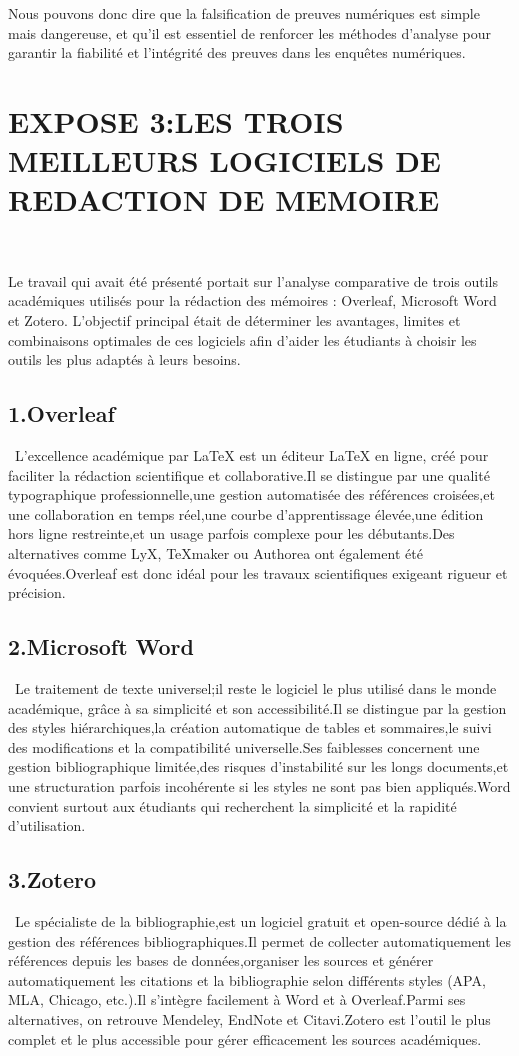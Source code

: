 \documentclass[12pt,a4paper]{report}
\begin{document}
{Nous pouvons donc dire que la falsification de preuves numériques est simple mais dangereuse, et qu’il est essentiel de renforcer les méthodes d’analyse pour garantir la fiabilité et l’intégrité des preuves dans les enquêtes numériques.
	\section*{EXPOSE 3:LES TROIS MEILLEURS LOGICIELS DE REDACTION DE MEMOIRE }\
	
	Le travail qui avait été présenté portait sur l’analyse comparative de trois outils académiques utilisés pour la rédaction des mémoires : Overleaf, Microsoft Word et Zotero. L’objectif principal était de déterminer les avantages, limites et combinaisons optimales de ces logiciels afin d’aider les étudiants à choisir les outils les plus adaptés à leurs besoins.
	
	\subsection*{1.Overleaf}\ L’excellence académique par LaTeX est un éditeur LaTeX en ligne, créé pour faciliter la rédaction scientifique et collaborative.Il se distingue par une qualité typographique professionnelle,une gestion automatisée des références croisées,et une collaboration en temps réel,une courbe d’apprentissage élevée,une édition hors ligne restreinte,et un usage parfois complexe pour les débutants.Des alternatives comme LyX, TeXmaker ou Authorea ont également été évoquées.Overleaf est donc idéal pour les travaux scientifiques exigeant rigueur et précision.
	
	\subsection*{2.Microsoft Word}\ Le traitement de texte universel;il reste le logiciel le plus utilisé dans le monde académique, grâce à sa simplicité et son accessibilité.Il se distingue par la gestion des styles hiérarchiques,la création automatique de tables et sommaires,le suivi des modifications et la compatibilité universelle.Ses faiblesses concernent une gestion bibliographique limitée,des risques d’instabilité sur les longs documents,et une structuration parfois incohérente si les styles ne sont pas bien appliqués.Word convient surtout aux étudiants qui recherchent la simplicité et la rapidité d’utilisation.
	
	\subsection*{3.Zotero}\ Le spécialiste de la bibliographie,est un logiciel gratuit et open-source dédié à la gestion des références bibliographiques.Il permet de collecter automatiquement les références depuis les bases de données,organiser les sources et générer automatiquement les citations et la bibliographie selon différents styles (APA, MLA, Chicago, etc.).Il s’intègre facilement à Word et à Overleaf.Parmi ses alternatives, on retrouve Mendeley, EndNote et Citavi.Zotero est l’outil le plus complet et le plus accessible pour gérer efficacement les sources académiques.
	\vspace{0.4cm}\
	
}
\end{document}
